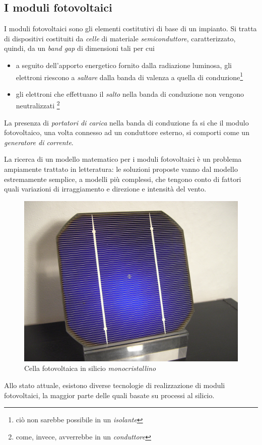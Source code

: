 %
\subsection{I moduli fotovoltaici}
I moduli fotovoltaici sono gli elementi costitutivi di base di un impianto. 
Si tratta di dispositivi costituiti da \emph{celle} di materiale 
\emph{semiconduttore}, caratterizzato, quindi, da un \emph{band gap} 
di dimensioni tali per cui 
%
\begin{itemize}
\item a seguito dell'apporto energetico fornito dalla radiazione luminosa, 
      gli elettroni riescono a \emph{saltare} dalla banda di valenza a 
      quella di conduzione\footnote{ci\`o non sarebbe possibile in un \emph{isolante}}
%
\item gli elettroni che effettuano il \emph{salto} nella banda di conduzione 
      non vengono neutralizzati
      \footnote{come, invece, avverrebbe in un \emph{conduttore}}
\end{itemize}
%
La presenza di \emph{portatori di carica} nella banda di conduzione 
fa si che il modulo fotovoltaico, una volta connesso ad un conduttore 
esterno, si comporti come un \emph{generatore di corrente}\cite{castaner02}.
%

%
La ricerca di un modello matematico per i moduli fotovoltaici \`e un problema 
ampiamente trattato in letteratura: le soluzioni proposte vanno dal modello 
estremamente semplice\cite{bellini09}, a modelli pi\`u complessi, 
che tengono conto di fattori quali variazioni di irraggiamento e 
direzione e intensit\`a del vento\cite{patel08}.

%
\begin{figure}[!h]
\centering
\includegraphics[width=350pt]{img/modulo-fotovoltaico.jpg}
\caption{Cella fotovoltaica in silicio \emph{monocristallino}}
\end{figure}
%
Allo stato attuale, esistono diverse tecnologie di realizzazione di 
moduli fotovoltaici, la maggior parte delle quali basate su processi 
al silicio.
%

